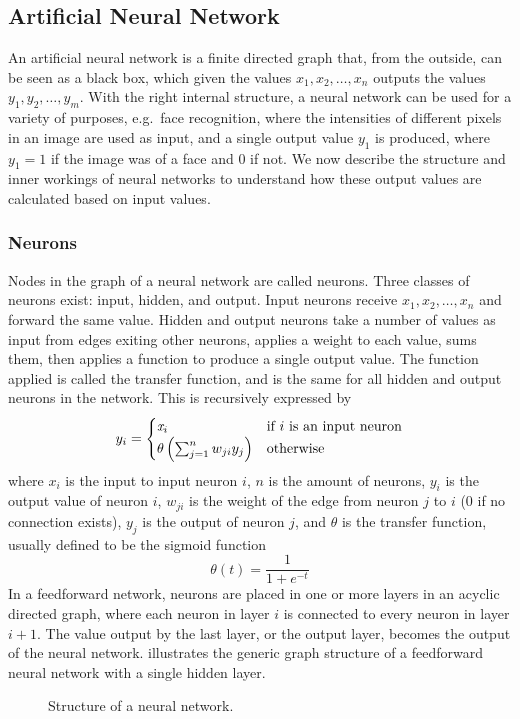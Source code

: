 \subsection{Artificial Neural Network}
An artificial neural network is a finite directed graph that, from the outside, can be seen as a black box, which given the values $x_1, x_2, \dots, x_n$ outputs the values $y_1, y_2, \dots, y_m$. With the right internal structure, a neural network can be used for a variety of purposes, e.g.\ face recognition, where the intensities of different pixels in an image are used as input, and a single output value $y_1$ is produced, where $y_1 = 1$ if the image was of a face and $0$ if not. We now describe the structure and inner workings of neural networks to understand how these output values are calculated based on input values.

\subsubsection{Neurons}
Nodes in the graph of a neural network are called neurons. Three classes of neurons exist: input, hidden, and output. Input neurons receive $x_1, x_2, \dots, x_n$ and forward the same value. Hidden and output neurons take a number of values as input from edges exiting other neurons, applies a weight to each value, sums them, then applies a function to produce a single output value. The function applied is called the transfer function, and is the same for all hidden and output neurons in the network. This is recursively expressed by 
\begin{equation*}\label{eq:weightcalc}
  y_i =
  \begin{cases}
    \var{x}_i                     & \text{if } i \text{ is an input neuron} \\
    \theta\left(\sum_{j=1}^n w_{ji} y_{j} \right) & \text{otherwise} %
  \end{cases}
\end{equation*}
%
where $x_i$ is the input to input neuron $i$, $n$ is the amount of neurons, $y_i$ is the output value of neuron $i$, $w_{ji}$ is the weight of the edge from neuron $j$ to $i$ ($0$ if no connection exists), $y_j$ is the output of neuron $j$, and $\theta$ is the transfer function, usually defined to be the sigmoid function
%
\begin{equation*}
  \theta(t) = \frac{1}{1+e^{-t}}
\end{equation*}
%
In a feedforward network, neurons are placed in one or more layers in an acyclic directed graph, where each neuron in layer $i$ is connected to every neuron in layer $i + 1$. The value output by the last layer, or the output layer, becomes the output of the neural network.  illustrates the generic graph structure of a feedforward neural network with a single hidden layer.
%
\begin{figure}[htpb]
  \centering
  \caption{Structure of a neural network.}
  \label{fig:ann}
\end{figure}
%
